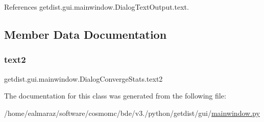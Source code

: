 References getdist.\+gui.\+mainwindow.\+Dialog\+Text\+Output.\+text.



\subsection{Member Data Documentation}
\mbox{\label{classgetdist_1_1gui_1_1mainwindow_1_1DialogConvergeStats_a9214266356d19a7e42190d89da4bf341}} 
\subsubsection{\texorpdfstring{text2}{text2}}
{\footnotesize\ttfamily getdist.\+gui.\+mainwindow.\+Dialog\+Converge\+Stats.\+text2}



The documentation for this class was generated from the following file\+:\begin{DoxyCompactItemize}
\item 
/home/ealmaraz/software/cosmomc/bde/v3./python/getdist/gui/\mbox{\hyperlink{mainwindow_8py}{mainwindow.\+py}}\end{DoxyCompactItemize}
